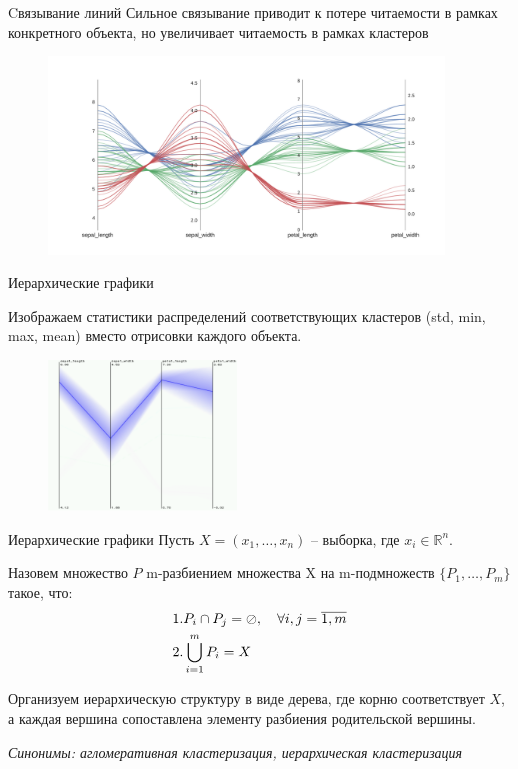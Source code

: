 \documentclass[fleqn, xcolor=x11names]{beamer}
\begin{document}
\begin{frame}{Cвязывание линий}  
    Сильное связывание приводит к потере читаемости в рамках конкретного объекта,
    но увеличивает читаемость в рамках кластеров

    \begin{figure}[htb]
        \centering
        \includegraphics[width=10.5cm]{bundle_0.01_pc.pdf}
    \end{figure}
\end{frame}

\begin{frame}{Иерархические графики}

    Изображаем статистики распределений соответствующих кластеров (std, min, max, mean)
    вместо отрисовки каждого объекта.

    \begin{figure}[htb]
        \centering
        \includegraphics[width=5cm]{hierarchical_1.png}
    \end{figure}
\end{frame}

\begin{frame}{Иерархические графики}
    Пусть $X=(x_1,\ldots,x_n)$ -- выборка, где $x_i\in \mathbb{R}^n$. 

    \vspace{10px}

    Назовем множество $P$ m-разбиением множества X на m-подмножеств $\{P_1,\ldots,P_m\}$
    такое, что:
    \begin{align}
        \notag &1. P_i \cap  P_j = \oslash, \hspace{10px} \forall i,j =\overline{1,m} \\
        \notag &2. \bigcup\limits_{i=1}^{m} P_i = X 
    \end{align}

    Организуем иерархическую структуру в виде дерева, где корню соответствует $X$, 
    а каждая вершина сопоставлена элементу разбиения родительской вершины.

    \vspace{10pt}

    \textit{Синонимы: агломеративная кластеризация, иерархическая кластеризация}
\end{frame}
\end{document}
